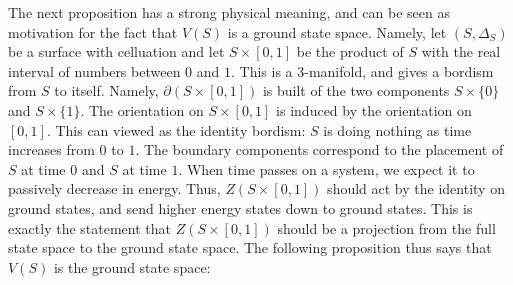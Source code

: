 \documentclass{article}
\theoremstyle{definition}
\numberwithin{figure}{section}
\begin{document}
The next proposition has a strong physical meaning, and can be seen as motivation for the fact that $V(S)$ is a ground state space. Namely, let $(S,\Delta_S)$ be a surface with celluation and let $S\times [0,1]$ be the product of $S$ with the real interval of numbers between $0$ and $1$. This is a $3$-manifold, and gives a bordism from $S$ to itself. Namely, $\partial (S\times [0,1])$ is built of the two components $S\times \{0\}$ and $S\times \{1\}$. The orientation on $S\times [0,1]$ is induced by the orientation on $[0,1]$. This can viewed as the identity bordism: $S$ is doing nothing as time increases from $0$ to $1$. The boundary components correspond to the placement of $S$ at time $0$ and $S$ at time $1$. When time passes on a system, we expect it to passively decrease in energy. Thus, $Z(S\times [0,1])$ should act by the identity on ground states, and send higher energy states down to ground states. This is exactly the statement that $Z(S\times [0,1])$ should be a projection from the full state space to the ground state space. The following proposition thus says that $V(S)$ is the ground state space:
\end{document}
